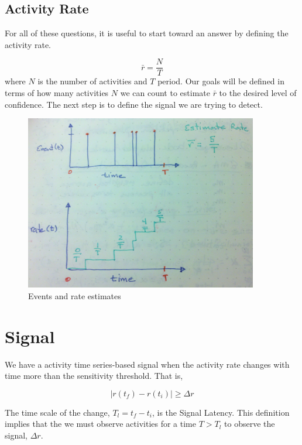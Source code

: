 \documentclass{article}
\begin{document}
\subsection{Activity Rate} %

For all of these questions, it is useful to start toward an answer by defining the activity rate.

\begin{equation}
    \label{eq:rateEst}
    \bar{r} = \frac{N}{T}
\end{equation}
where $N$ is the number of activities and $T$ period.  Our goals will be defined in terms of how many activities $N$ we can count to estimate $\bar{r}$ to the desired level of confidence. The next step is to define the signal we are trying to detect.

\begin{figure}
    \centering
    \includegraphics[width=4.0in]{./imgs/events.jpg}
    \caption{Events and rate estimates}
    \label{fig:events}
\end{figure}

\section{Signal} %

We have a activity time series-based signal when the activity rate changes with time more than the sensitivity threshold.  That is,

\begin{equation}
    \label{eq:signal}
    | r(t_f) - r(t_i) | \geq \Delta r
\end{equation}

The time scale of the change, $T_l = t_f - t_i$, is the Signal Latency.  This definition implies that the we must observe activities for a time $T > T_l$ to observe the signal, $\Delta r$.
\end{document}
